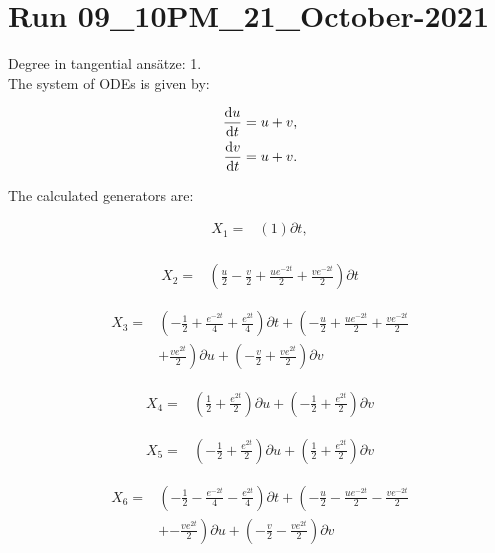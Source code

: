 \section*{Run 09\_10PM\_21\_October-2021}
Degree in tangential ansätze:	1.\\
The system of ODEs is given by:

\begin{align*}
\dv{u}{t}&=u + v,\\
\dv{v}{t}&=u + v.\\
\end{align*}

\noindent The calculated generators are:

\begin{align*}
X_{1}=&\left(1 \right)\partial t,\\
\end{align*}

\begin{align*}
X_{2}=&\left(\frac{u}{2}- \frac{v}{2}+\frac{u e^{- 2 t}}{2}+\frac{v e^{- 2 t}}{2} \right)\partial t
\end{align*}

\begin{align*}
X_{3}=&\left(- \frac{1}{2}+\frac{e^{- 2 t}}{4}+\frac{e^{2 t}}{4} \right)\partial t+\left(- \frac{u}{2}+\frac{u e^{- 2 t}}{2}+\frac{v e^{- 2 t}}{2}\right.\\
&+\left.\frac{v e^{2 t}}{2} \right)\partial u+\left(- \frac{v}{2}+\frac{v e^{2 t}}{2} \right)\partial v
\end{align*}

\begin{align*}
X_{4}=&\left(\frac{1}{2}+\frac{e^{2 t}}{2} \right)\partial u+\left(- \frac{1}{2}+\frac{e^{2 t}}{2} \right)\partial v
\end{align*}

\begin{align*}
X_{5}=&\left(- \frac{1}{2}+\frac{e^{2 t}}{2} \right)\partial u+\left(\frac{1}{2}+\frac{e^{2 t}}{2} \right)\partial v
\end{align*}

\begin{align*}
X_{6}=&\left(- \frac{1}{2}- \frac{e^{- 2 t}}{4}- \frac{e^{2 t}}{4} \right)\partial t+\left(- \frac{u}{2}- \frac{u e^{- 2 t}}{2}- \frac{v e^{- 2 t}}{2}\right.\\
&+\left.- \frac{v e^{2 t}}{2} \right)\partial u+\left(- \frac{v}{2}- \frac{v e^{2 t}}{2} \right)\partial v
\end{align*}


